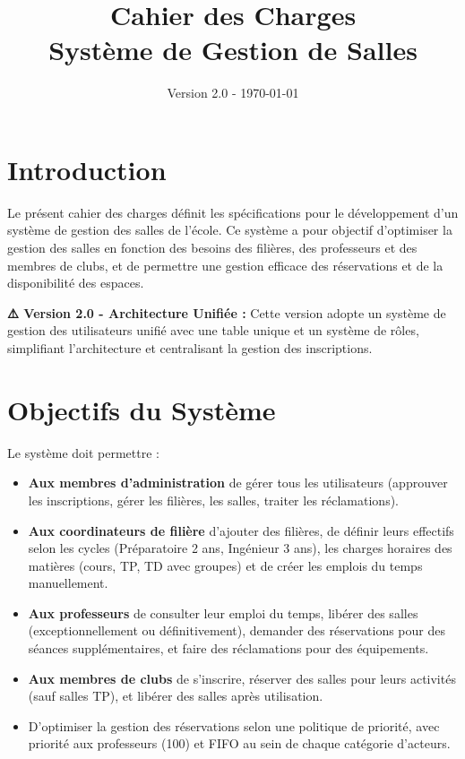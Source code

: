 \documentclass[12pt,a4paper]{article}
\title{\textbf{Cahier des Charges\\Système de Gestion de Salles}}
\author{}
\date{Version 2.0 - \today}
\begin{document}
\maketitle
\tableofcontents
\newpage

\section{Introduction}

Le présent cahier des charges définit les spécifications pour le développement d'un système de gestion des salles de l'école. Ce système a pour objectif d'optimiser la gestion des salles en fonction des besoins des filières, des professeurs et des membres de clubs, et de permettre une gestion efficace des réservations et de la disponibilité des espaces.

\textbf{⚠️ Version 2.0 - Architecture Unifiée :} Cette version adopte un système de gestion des utilisateurs unifié avec une table unique et un système de rôles, simplifiant l'architecture et centralisant la gestion des inscriptions.

\section{Objectifs du Système}

Le système doit permettre :

\begin{itemize}
    \item \textbf{Aux membres d'administration} de gérer tous les utilisateurs (approuver les inscriptions, gérer les filières, les salles, traiter les réclamations).
    \item \textbf{Aux coordinateurs de filière} d'ajouter des filières, de définir leurs effectifs selon les cycles (Préparatoire 2 ans, Ingénieur 3 ans), les charges horaires des matières (cours, TP, TD avec groupes) et de créer les emplois du temps manuellement.
    \item \textbf{Aux professeurs} de consulter leur emploi du temps, libérer des salles (exceptionnellement ou définitivement), demander des réservations pour des séances supplémentaires, et faire des réclamations pour des équipements.
    \item \textbf{Aux membres de clubs} de s'inscrire, réserver des salles pour leurs activités (sauf salles TP), et libérer des salles après utilisation.
    \item D'optimiser la gestion des réservations selon une politique de priorité, avec priorité aux professeurs (100) et FIFO au sein de chaque catégorie d'acteurs.
\end{itemize}
\end{document}

